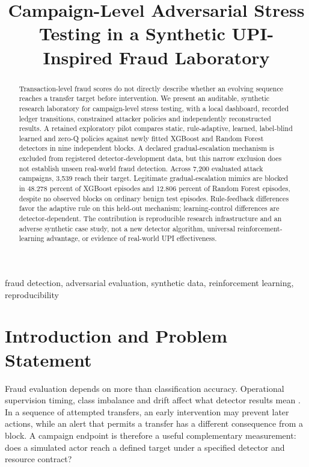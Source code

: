\documentclass[conference]{IEEEtran}
\begin{document}
\title{Campaign-Level Adversarial Stress Testing in a Synthetic UPI-Inspired Fraud Laboratory}
\author{
}
\maketitle
\begin{abstract}
Transaction-level fraud scores do not directly describe whether an evolving sequence reaches a transfer target before intervention. We present an auditable, synthetic research laboratory for campaign-level stress testing, with a local dashboard, recorded ledger transitions, constrained attacker policies and independently reconstructed results. A retained exploratory pilot compares static, rule-adaptive, learned, label-blind learned and zero-Q policies against newly fitted XGBoost and Random Forest detectors in nine independent blocks. A declared gradual-escalation mechanism is excluded from registered detector-development data, but this narrow exclusion does not establish unseen real-world fraud detection. Across 7,200 evaluated attack campaigns, 3,539 reach their target. Legitimate gradual-escalation mimics are blocked in 48.278 percent of XGBoost episodes and 12.806 percent of Random Forest episodes, despite no observed blocks on ordinary benign test episodes. Rule-feedback differences favor the adaptive rule on this held-out mechanism; learning-control differences are detector-dependent. The contribution is reproducible research infrastructure and an adverse synthetic case study, not a new detector algorithm, universal reinforcement-learning advantage, or evidence of real-world UPI effectiveness.
\end{abstract}
\begin{IEEEkeywords}
fraud detection, adversarial evaluation, synthetic data, reinforcement learning, reproducibility
\end{IEEEkeywords}

\section{Introduction and Problem Statement}
Fraud evaluation depends on more than classification accuracy. Operational supervision timing, class imbalance and drift affect what detector results mean \cite{dalpozzolo}. In a sequence of attempted transfers, an early intervention may prevent later actions, while an alert that permits a transfer has a different consequence from a block. A campaign endpoint is therefore a useful complementary measurement: does a simulated actor reach a defined target under a specified detector and resource contract?
\end{document}
